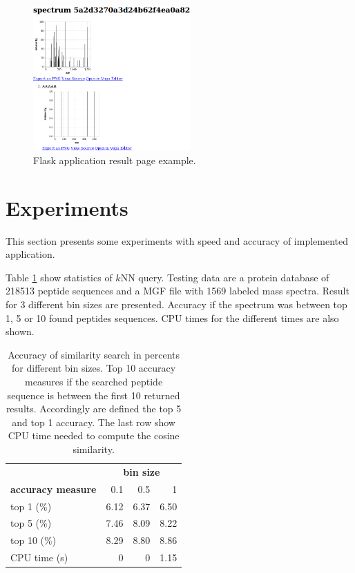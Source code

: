 \documentclass[a4paper,10pt,twocolumn]{article}
\begin{document}
\begin{figure}[H]
    \begin{center}
        \includegraphics[width=6cm]{img/output-sample}
    \end{center}
    \caption{Flask application result page example.}
    \label{fig:sample}
\end{figure}

\section{Experiments}

This section presents some experiments with speed and accuracy of
implemented application.

Table \ref{table:experiments} show statistics of \(k\)NN query.
Testing data are a protein database of 218513 peptide sequences and a MGF file
with 1569 labeled mass spectra. Result for 3 different bin sizes are presented.
Accuracy if the spectrum was between top 1, 5 or 10 found peptides sequences.
CPU times for the different times are also shown.

\begin{table}[H]
    \begin{center}
        \label{table:experiments}
        \begin{tabular}{l|rrr}
            & \multicolumn{3}{c}{\textbf{bin size}} \\
            \textbf{accuracy measure} & 0.1 & 0.5 & 1 \\
            \hline
            top 1 (\%) & 6.12 & 6.37 & 6.50 \\
            top 5 (\%) & 7.46 & 8.09 & 8.22 \\
            top 10 (\%) & 8.29 & 8.80 & 8.86 \\
            CPU time (s) & 0 & 0 & 1.15 \\
        \end{tabular}
        \caption{
            Accuracy of similarity search in percents for different bin sizes.
            Top 10 accuracy measures if the searched peptide sequence is between
            the first 10 returned results. Accordingly are defined the top 5
            and top 1 accuracy. The last row show CPU time needed to compute
            the cosine similarity.
        }
    \end{center}
\end{table}
\end{document}

